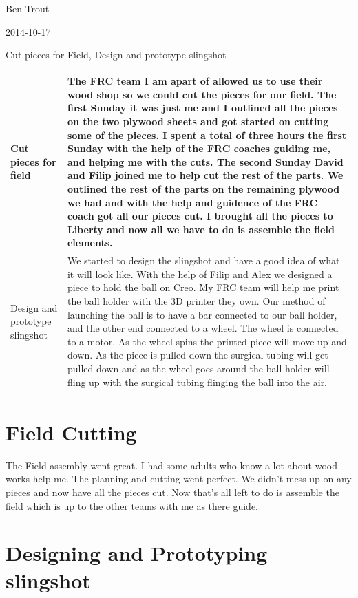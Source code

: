 Ben Trout

2014-10-17

Cut pieces for Field, Design and prototype slingshot

\begin{tabular}{|p{5cm}|p{5cm}|}
\hline
Cut pieces for field&
The FRC team I am apart of allowed us to use their wood shop so we could cut the pieces for our field. The first Sunday it was just me and I outlined all the pieces on the two plywood sheets and got started on cutting some of the pieces. I spent a total of three hours the first Sunday with the help of the FRC coaches guiding me, and helping me with the cuts. The second Sunday David and Filip joined me to help cut the rest of the parts. We outlined the rest of the parts on the remaining plywood we had and with the help and guidence of the FRC coach got all our pieces cut. I brought all the pieces to Liberty and now all we have to do is assemble the field elements.
\\
\hline
Design and prototype slingshot&
We started to design the slingshot and have a good idea of what it will look like. With the help of Filip and Alex we designed a piece to hold the ball on Creo. My FRC team will help me print the ball holder with the 3D printer they own. Our method of launching the ball is to have a bar connected to our ball holder, and the other end connected to a wheel. The wheel is connected to a motor. As the wheel spins the printed piece will move up and down. As the piece is pulled down the surgical tubing will get pulled down and as the wheel goes around the ball holder will fling up with the surgical tubing flinging the ball into the air.
\\
\hline
\end{tabular}

\section*{Field Cutting}

The Field assembly went great. I had some adults who know a lot about wood works help me. The planning and cutting went perfect. We didn't mess up on any pieces and now have all the pieces cut. Now that's all left to do is assemble the field which is up to the other teams with me as there guide. 

\section*{Designing and Prototyping slingshot}

